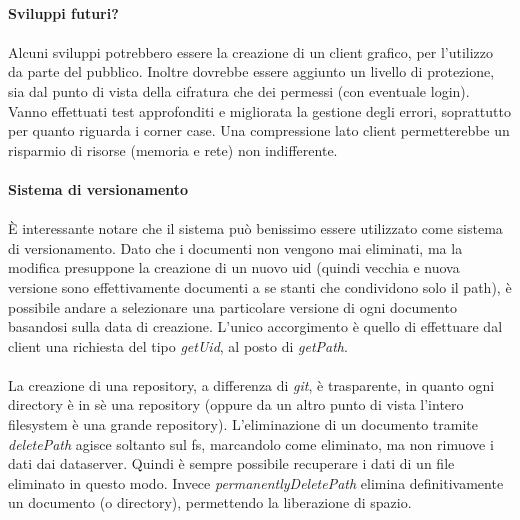 \documentclass{article}
\begin{document}
\paragraph{Sviluppi futuri?}

\paragraph{} Alcuni sviluppi potrebbero essere la creazione di un client grafico, per l'utilizzo da parte del pubblico. Inoltre dovrebbe essere aggiunto un livello di protezione, sia dal punto di vista della cifratura che dei permessi (con eventuale login). Vanno effettuati test approfonditi e migliorata la gestione degli errori, soprattutto per quanto riguarda i corner case. Una compressione lato client permetterebbe un risparmio di risorse (memoria e rete) non indifferente. 

\paragraph{Sistema di versionamento}

\paragraph{} È interessante notare che il sistema può benissimo essere utilizzato come sistema di versionamento. Dato che i documenti non vengono mai eliminati, ma la modifica presuppone la creazione di un nuovo uid (quindi vecchia e nuova versione sono effettivamente documenti a se stanti che condividono solo il path), è possibile andare a selezionare una particolare versione di ogni documento basandosi sulla data di creazione. L'unico accorgimento è quello di effettuare dal client una richiesta del tipo \emph{getUid}, al posto di \emph{getPath}.

\paragraph{} La creazione di una repository, a differenza di \emph{git}, è trasparente, in quanto ogni directory è in sè una repository (oppure da un altro punto di vista l'intero filesystem è una grande repository). L'eliminazione di un documento tramite \emph{deletePath} agisce soltanto sul fs, marcandolo come eliminato, ma non rimuove i dati dai dataserver. Quindi è sempre possibile recuperare i dati di un file eliminato in questo modo. Invece \emph{permanentlyDeletePath} elimina definitivamente un documento (o directory), permettendo la liberazione di spazio. 
\end{document}
